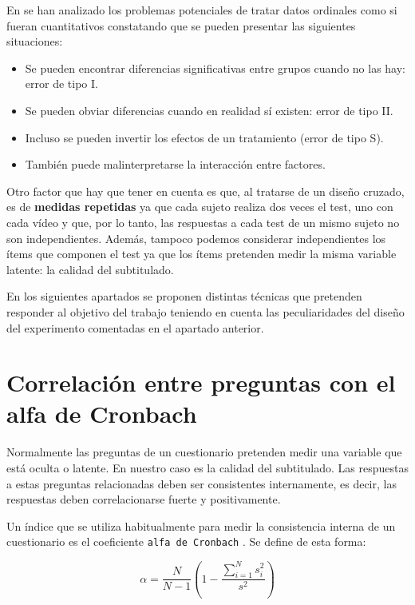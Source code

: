 \documentclass[
  12pt,
  a4paper,
  extrafontsizes,
  onecolumn,
  openright]{memoir}
\providecommand{\tightlist}{%
  \setlength{\itemsep}{0pt}\setlength{\parskip}{0pt}}\usepackage{longtable,booktabs,array}
\begin{document}
En \textcite{kruschke2018} se han analizado los problemas potenciales de
tratar datos ordinales como si fueran cuantitativos constatando que se
pueden presentar las siguientes situaciones:

\begin{itemize}
\tightlist
\item
  Se pueden encontrar diferencias significativas entre grupos cuando no
  las hay: error de tipo I.
\item
  Se pueden obviar diferencias cuando en realidad sí existen: error de
  tipo II.
\item
  Incluso se pueden invertir los efectos de un tratamiento (error de
  tipo S).
\item
  También puede malinterpretarse la interacción entre factores.
\end{itemize}

Otro factor que hay que tener en cuenta es que, al tratarse de un diseño
cruzado, es de \textbf{medidas repetidas} ya que cada sujeto realiza dos
veces el test, uno con cada vídeo y que, por lo tanto, las respuestas a
cada test de un mismo sujeto no son independientes. Además, tampoco
podemos considerar independientes los ítems que componen el test ya que
los ítems pretenden medir la misma variable latente: la calidad del
subtitulado.

En los siguientes apartados se proponen distintas técnicas que pretenden
responder al objetivo del trabajo teniendo en cuenta las peculiaridades
del diseño del experimento comentadas en el apartado anterior.

\hypertarget{sec-cronbach}{%
\section{Correlación entre preguntas con el alfa de
Cronbach}\label{sec-cronbach}}

Normalmente las preguntas de un cuestionario pretenden medir una
variable que está oculta o latente. En nuestro caso es la calidad del
subtitulado. Las respuestas a estas preguntas relacionadas deben ser
consistentes internamente, es decir, las respuestas deben
correlacionarse fuerte y positivamente.

Un índice que se utiliza habitualmente para medir la consistencia
interna de un cuestionario es el coeficiente \texttt{alfa\ de\ Cronbach}
\autocite[ver][]{schweinberger2020survey}. Se define de esta forma:

\begin{equation}
\alpha = \frac{N}{N-1} \left(1 - \frac{\sum_{i=1}^{N} s_{i}^{2}}{s^{2}} \right)
\end{equation}
\end{document}
